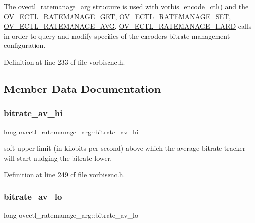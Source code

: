 The \mbox{\hyperlink{structovectl__ratemanage__arg}{ovectl\+\_\+ratemanage\+\_\+arg}} structure is used with \mbox{\hyperlink{vorbisenc_8h_a5f398a378e20b8ce5e3341a582e773bd}{vorbis\+\_\+encode\+\_\+ctl()}} and the \mbox{\hyperlink{vorbisenc_8h_a614481c0d84bdfbb80eed9208b68f779}{O\+V\+\_\+\+E\+C\+T\+L\+\_\+\+R\+A\+T\+E\+M\+A\+N\+A\+G\+E\+\_\+\+G\+ET}}, \mbox{\hyperlink{vorbisenc_8h_a1daa1fd8ce1064cce01dde3ad447d389}{O\+V\+\_\+\+E\+C\+T\+L\+\_\+\+R\+A\+T\+E\+M\+A\+N\+A\+G\+E\+\_\+\+S\+ET}}, \mbox{\hyperlink{vorbisenc_8h_a34c3170d227b6368041e59c1dc7ed6e4}{O\+V\+\_\+\+E\+C\+T\+L\+\_\+\+R\+A\+T\+E\+M\+A\+N\+A\+G\+E\+\_\+\+A\+VG}}, \mbox{\hyperlink{vorbisenc_8h_af8869980a805f431af57a50dffbf5d33}{O\+V\+\_\+\+E\+C\+T\+L\+\_\+\+R\+A\+T\+E\+M\+A\+N\+A\+G\+E\+\_\+\+H\+A\+RD}} calls in order to query and modify specifics of the encoder\textquotesingle{}s bitrate management configuration. 

Definition at line 233 of file vorbisenc.\+h.



\subsection{Member Data Documentation}
\mbox{\label{structovectl__ratemanage__arg_ac1e81b5a2e705022ca895f494718ded7}} 
\subsubsection{\texorpdfstring{bitrate\_av\_hi}{bitrate\_av\_hi}}
{\footnotesize\ttfamily long ovectl\+\_\+ratemanage\+\_\+arg\+::bitrate\+\_\+av\+\_\+hi}

soft upper limit (in kilobits per second) above which the average bitrate tracker will start nudging the bitrate lower. 

Definition at line 249 of file vorbisenc.\+h.

\mbox{\label{structovectl__ratemanage__arg_ac241670a3a608f114acaf8f26fe4e913}} 
\subsubsection{\texorpdfstring{bitrate\_av\_lo}{bitrate\_av\_lo}}
{\footnotesize\ttfamily long ovectl\+\_\+ratemanage\+\_\+arg\+::bitrate\+\_\+av\+\_\+lo}

